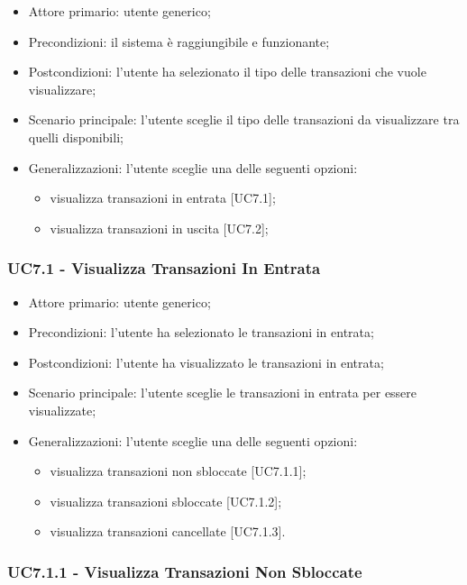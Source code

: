 \begin{itemize}
    \item Attore primario: utente generico;
    \item Precondizioni: il sistema è raggiungibile e funzionante;
    \item Postcondizioni: l'utente ha selezionato il tipo delle transazioni che vuole visualizzare;
    \item Scenario principale: l'utente sceglie il tipo delle transazioni da visualizzare tra quelli disponibili;
    \item Generalizzazioni: l'utente sceglie una delle seguenti opzioni:
    \begin{itemize}
        \item visualizza transazioni in entrata [UC7.1];
        \item visualizza transazioni in uscita [UC7.2];
    \end{itemize}
\end{itemize}

\subsubsection{UC7.1 - Visualizza Transazioni In Entrata}

\begin{itemize}
    \item Attore primario: utente generico;
    \item Precondizioni: l'utente ha selezionato le transazioni in entrata;
    \item Postcondizioni: l'utente ha visualizzato le transazioni in entrata;
    \item Scenario principale: l'utente sceglie le transazioni in entrata per essere visualizzate;
    \item Generalizzazioni: l'utente sceglie una delle seguenti opzioni:
    \begin{itemize}
        \item visualizza transazioni non sbloccate [UC7.1.1];
        \item visualizza transazioni sbloccate [UC7.1.2];
        \item visualizza transazioni cancellate [UC7.1.3].
    \end{itemize}
\end{itemize}

\subsubsection{UC7.1.1 - Visualizza Transazioni Non Sbloccate}

